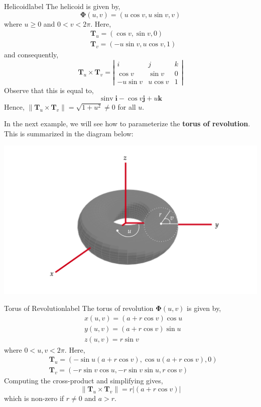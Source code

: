 \begin{ex}{Helicoid}{label}
	The helicoid is given by,
	\[\mathbf{\Phi}(u, v)=(u \cos v, u \sin v, v)\]
	where $u \geq 0$ and $0 < v < 2 \pi$. Here,
	\begin{align*}
		&\mathbf{T}_u=(\cos v, \sin v, 0) \\
		&\mathbf{T}_v=(-u \sin v, u \cos v, 1)
	\end{align*}
	and consequently,
	\[\mathbf{T}_u \times \mathbf{T}_v=\left|\begin{array}{ccc}
	i & j & k \\
	\cos v & \sin v & 0 \\
	-u \sin v & u \cos v & 1
	\end{array}\right|\]
	Observe that this is equal to,
	\[\operatorname{sinv} \mathbf{i}-\cos v \mathbf{j}+u \mathbf{k}\]
	Hence, $\left\|\mathbf{T}_u \times \mathbf{T}_v\right\|=\sqrt{1+u^2} \neq 0$ for all $u$.
\end{ex}

\hfill

\noindent In the next example, we will see how to parameterize the \textbf{torus of revolution}. This is summarized in the diagram below:

\begin{center}
   \includegraphics[width=\textwidth]{figures/wk-6/fig-16.png}
\end{center}

\begin{ex}{Torus of Revolution}{label}
	The torus of revolution $\mathbf{\Phi}(u, v)$ is given by,
	\begin{align*}
		&x(u, v)=(a+r \cos v) \cos u \\
		&y(u, v)=(a+r \cos v) \sin u \\
		&z(u, v)=r \sin v
	\end{align*}
	where $0 < u, v < 2 \pi$. Here,
	\begin{align*}
		&\mathbf{T}_u=(-\sin u(a+r \cos v), \cos u(a+r \cos v), 0) \\
		&\mathbf{T}_v=(-r \sin v \cos u,-r \sin v \sin u, r \cos v)
	\end{align*}
	Computing the cross-product and simplifying gives,
	\[\|\mathbf{T}_u \times \mathbf{T}_v\| = r|(a+r \cos v)|\]
	which is non-zero if $r \neq 0$ and $a > r$.
\end{ex}

